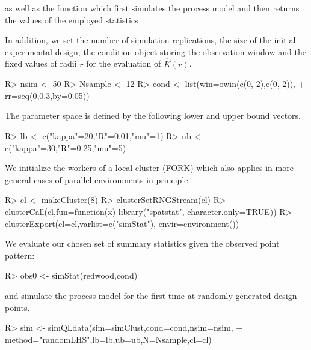 \documentclass[article, nojss]{jss}
\numberwithin{equation}{section}			%
\begin{document}
as well as the function which first simulates the process model and then returns
the values of the employed statistics
\begin{Schunk}
\end{Schunk}
In addition, we set the number of simulation replications, the size of the
initial experimental design, the condition object storing the observation window
and the fixed values of radii $r$ for the evaluation of $\hat{K}(r)$.
\begin{Schunk}
\begin{Sinput}
R> nsim <- 50
R> Nsample <- 12
R> cond <- list(win=owin(c(0, 2),c(0, 2)),
+              rr=seq(0,0.3,by=0.05))
\end{Sinput}
\end{Schunk}
The parameter space is defined by the following lower and upper bound vectors.
\begin{Schunk}
\begin{Sinput}
R> lb <- c("kappa"=20,"R"=0.01,"mu"=1)
R> ub <- c("kappa"=30,"R"=0.25,"mu"=5)	 
\end{Sinput}
\end{Schunk}
We initialize the workers of a local cluster (FORK) which also applies in more
general cases of parallel environments in principle.
\begin{Schunk}
\begin{Sinput}
R> cl <- makeCluster(8)
R> clusterSetRNGStream(cl)
R> clusterCall(cl,fun=function(x) library("spatstat", character.only=TRUE))
R> clusterExport(cl=cl,varlist=c("simStat"), envir=environment())
\end{Sinput}
\end{Schunk}
We evaluate our chosen set of summary statistics given the observed point
pattern:
\begin{Schunk}
\begin{Sinput}
R> obs0 <- simStat(redwood,cond)
\end{Sinput}
\end{Schunk}
and simulate the process model for the first time at randomly generated design points.
\begin{Schunk}
\begin{Sinput}
R> sim <- simQLdata(sim=simClust,cond=cond,nsim=nsim,
+           method="randomLHS",lb=lb,ub=ub,N=Nsample,cl=cl)
\end{Sinput}
\end{Schunk}
\end{document}
